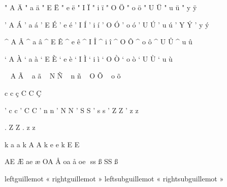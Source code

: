 

\startencoding[pdfdoc]

  " A ^^c4 
  " a ^^e4
  " E ^^cb
  " e ^^eb
  " I ^^cf
  " i ^^ef
  " O ^^d6
  " o ^^f6
  " U ^^dc
  " u ^^fc
  " y ^^ff
             
  ' A ^^c1
  ' a ^^e1
  ' E ^^c9
  ' e ^^e9
  ' I ^^cd
  ' i ^^ed
  ' O ^^d3
  ' o ^^f3
  ' U ^^da
  ' u ^^fa
  ' Y ^^dd
  ' y ^^fd

  ^ A ^^c2
  ^ a ^^e2
  ^ E ^^ca
  ^ e ^^ea
  ^ I ^^ce
  ^ i ^^ee
  ^ O ^^d4
  ^ o ^^f4
  ^ U ^^db
  ^ u ^^fb
             
  ` A ^^c0
  ` a ^^e0
  ` E ^^c8
  ` e ^^e8
  ` I ^^cc
  ` i ^^ec
  ` O ^^d2
  ` o ^^f2
  ` U ^^d9
  ` u ^^f9
             
  ~ A ^^c3
  ~ a ^^e3
  ~ N ^^d1
  ~ n ^^f1
  ~ O ^^d5
  ~ o ^^f5

  c c ^^e7 
  C C ^^c7

  ' c  c %
  ' C  C %
  ' n  n %
  ' N  N %
  ' S  S %
  ' s  s %
  ' Z  Z %
  ' z  z %

  . Z  Z %
  . z  z %

  k a  a %
  k A  A %
  k e  e %
  k E  E %

 AE ^^c6
 ae ^^e6
 OA ^^c5
 oa ^^e5
 oe ^^9c
 ss ^^df
 SS ^^df

 leftguillemot     ^^ab
 rightguillemot    ^^bb
 leftsubguillemot  ^^ab
 rightsubguillemot ^^bb

\stopencoding

\endinput
